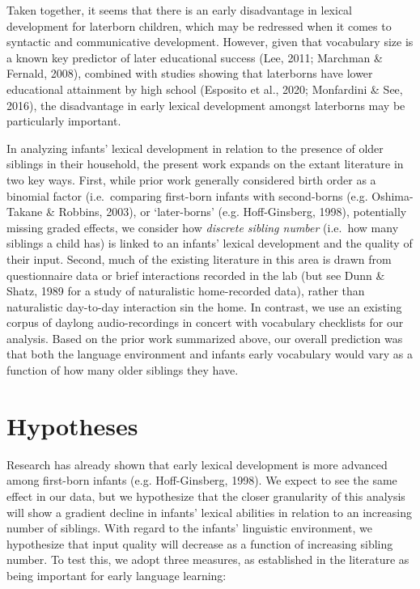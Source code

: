 \documentclass[
  english,
  man,floatsintext]{apa6}
\begin{document}
Taken together, it seems that there is an early disadvantage in lexical development for laterborn children, which may be redressed when it comes to syntactic and communicative development. However, given that vocabulary size is a known key predictor of later educational success (Lee, 2011; Marchman \& Fernald, 2008), combined with studies showing that laterborns have lower educational attainment by high school (Esposito et al., 2020; Monfardini \& See, 2016), the disadvantage in early lexical development amongst laterborns may be particularly important.

In analyzing infants' lexical development in relation to the presence of older siblings in their household, the present work expands on the extant literature in two key ways. First, while prior work generally considered birth order as a binomial factor (i.e.~comparing first-born infants with second-borns (e.g. Oshima-Takane \& Robbins, 2003), or `later-borns' (e.g. Hoff-Ginsberg, 1998), potentially missing graded effects, we consider how \emph{discrete sibling number} (i.e.~how many siblings a child has) is linked to an infants' lexical development and the quality of their input. Second, much of the existing literature in this area is drawn from questionnaire data or brief interactions recorded in the lab (but see Dunn \& Shatz, 1989 for a study of naturalistic home-recorded data), rather than naturalistic day-to-day interaction sin the home. In contrast, we use an existing corpus of daylong audio-recordings in concert with vocabulary checklists for our analysis. Based on the prior work summarized above, our overall prediction was that both the language environment and infants early vocabulary would vary as a function of how many older siblings they have.

\hypertarget{hypotheses}{%
\section{Hypotheses}\label{hypotheses}}

Research has already shown that early lexical development is more advanced among first-born infants (e.g. Hoff-Ginsberg, 1998). We expect to see the same effect in our data, but we hypothesize that the closer granularity of this analysis will show a gradient decline in infants' lexical abilities in relation to an increasing number of siblings.
With regard to the infants' linguistic environment, we hypothesize that input quality will decrease as a function of increasing sibling number. To test this, we adopt three measures, as established in the literature as being important for early language learning:
\end{document}
